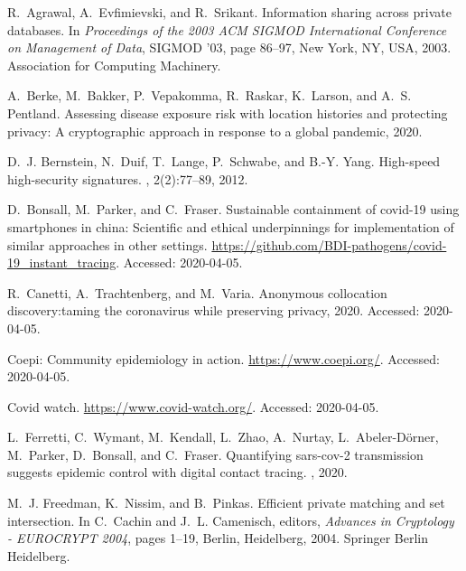 % 
% 

\begin{thebibliography}{10}

R.~Agrawal, A.~Evfimievski, and R.~Srikant.
\newblock Information sharing across private databases.
\newblock In {\em Proceedings of the 2003 ACM SIGMOD International Conference
  on Management of Data}, SIGMOD ’03, page 86–97, New York, NY, USA, 2003.
  Association for Computing Machinery.

A.~Berke, M.~Bakker, P.~Vepakomma, R.~Raskar, K.~Larson, and A.~S. Pentland.
\newblock Assessing disease exposure risk with location histories and
  protecting privacy: A cryptographic approach in response to a global
  pandemic, 2020.

D.~J. Bernstein, N.~Duif, T.~Lange, P.~Schwabe, and B.-Y. Yang.
\newblock High-speed high-security signatures.
, 2(2):77--89, 2012.

D.~Bonsall, M.~Parker, and C.~Fraser.
\newblock Sustainable containment of covid-19 using smartphones in china:
  Scientific and ethical underpinnings for implementation of similar approaches
  in other settings.
\newblock \url{https://github.com/BDI-pathogens/covid-19_instant_tracing}.
\newblock Accessed: 2020-04-05.

R.~Canetti, A.~Trachtenberg, and M.~Varia.
\newblock Anonymous collocation discovery:taming the coronavirus while
  preserving privacy, 2020.
\newblock Accessed: 2020-04-05.

Coepi: Community epidemiology in action.
\newblock \url{https://www.coepi.org/}.
\newblock Accessed: 2020-04-05.

Covid watch.
\newblock \url{https://www.covid-watch.org/}.
\newblock Accessed: 2020-04-05.

L.~Ferretti, C.~Wymant, M.~Kendall, L.~Zhao, A.~Nurtay, L.~Abeler-D{\"o}rner,
  M.~Parker, D.~Bonsall, and C.~Fraser.
\newblock Quantifying sars-cov-2 transmission suggests epidemic control with
  digital contact tracing.
, 2020.

M.~J. Freedman, K.~Nissim, and B.~Pinkas.
\newblock Efficient private matching and set intersection.
\newblock In C.~Cachin and J.~L. Camenisch, editors, {\em Advances in
  Cryptology - EUROCRYPT 2004}, pages 1--19, Berlin, Heidelberg, 2004. Springer
  Berlin Heidelberg.


\end{thebibliography}
